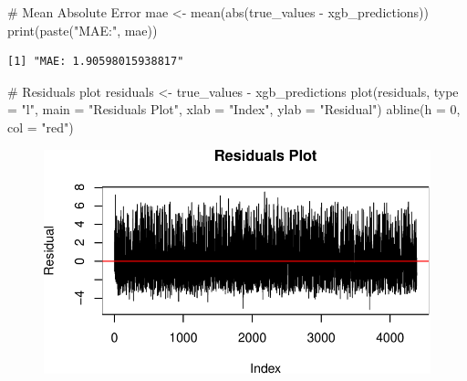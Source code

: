 \documentclass[
  super,
  preprint,
  3p]{elsarticle}
\newenvironment{Shaded}{\begin{snugshade}}{\end{snugshade}}
\newcommand{\AttributeTok}[1]{\textcolor[rgb]{0.40,0.45,0.13}{#1}}
\newcommand{\CommentTok}[1]{\textcolor[rgb]{0.37,0.37,0.37}{#1}}
\newcommand{\DecValTok}[1]{\textcolor[rgb]{0.68,0.00,0.00}{#1}}
\newcommand{\FunctionTok}[1]{\textcolor[rgb]{0.28,0.35,0.67}{#1}}
\newcommand{\NormalTok}[1]{\textcolor[rgb]{0.00,0.23,0.31}{#1}}
\newcommand{\OtherTok}[1]{\textcolor[rgb]{0.00,0.23,0.31}{#1}}
\newcommand{\SpecialCharTok}[1]{\textcolor[rgb]{0.37,0.37,0.37}{#1}}
\newcommand{\StringTok}[1]{\textcolor[rgb]{0.13,0.47,0.30}{#1}}
\begin{document}
\begin{Shaded}
\begin{Highlighting}[]
\CommentTok{\# Mean Absolute Error}
\NormalTok{mae }\OtherTok{\textless{}{-}} \FunctionTok{mean}\NormalTok{(}\FunctionTok{abs}\NormalTok{(true\_values }\SpecialCharTok{{-}}\NormalTok{ xgb\_predictions))}
\FunctionTok{print}\NormalTok{(}\FunctionTok{paste}\NormalTok{(}\StringTok{"MAE:"}\NormalTok{, mae))}
\end{Highlighting}
\end{Shaded}

\begin{verbatim}
[1] "MAE: 1.90598015938817"
\end{verbatim}

\begin{Shaded}
\begin{Highlighting}[]
\CommentTok{\# Residuals plot}
\NormalTok{residuals }\OtherTok{\textless{}{-}}\NormalTok{ true\_values }\SpecialCharTok{{-}}\NormalTok{ xgb\_predictions}
\FunctionTok{plot}\NormalTok{(residuals, }\AttributeTok{type =} \StringTok{"l"}\NormalTok{, }\AttributeTok{main =} \StringTok{"Residuals Plot"}\NormalTok{, }\AttributeTok{xlab =} \StringTok{"Index"}\NormalTok{, }\AttributeTok{ylab =} \StringTok{"Residual"}\NormalTok{)}
\FunctionTok{abline}\NormalTok{(}\AttributeTok{h =} \DecValTok{0}\NormalTok{, }\AttributeTok{col =} \StringTok{"red"}\NormalTok{)}
\end{Highlighting}
\end{Shaded}

\begin{figure}[H]

{\centering \includegraphics{project_report_files/figure-pdf/unnamed-chunk-16-1.pdf}

}

\end{figure}
\end{document}
